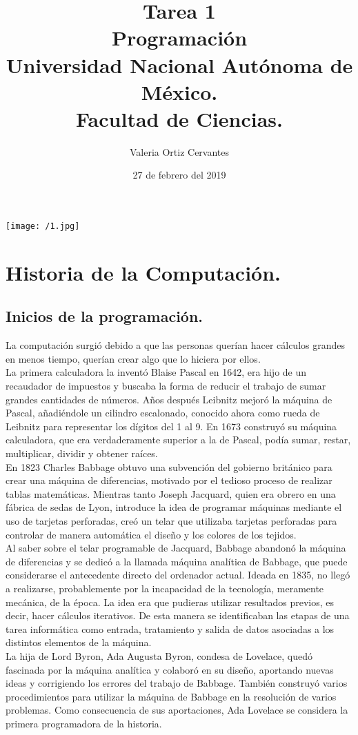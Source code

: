 \documentclass{book} %
\title{\Huge Tarea 1\\Programación\\Universidad Nacional Autónoma de México.\\Facultad de Ciencias.\\}
\author{\huge Valeria Ortiz Cervantes}
\date{\LARGE 27 de febrero del 2019}
\begin{document}
	
\maketitle
\texttt{[image: /1.jpg]}
\newpage

\tableofcontents

\chapter{\large Historia de la Computación.}
\section{Inicios de la programación.}
La computación surgió debido a que las personas querían hacer cálculos grandes en menos tiempo, querían crear algo que lo hiciera por ellos.\\La primera calculadora la inventó Blaise Pascal en 1642, era hijo de un recaudador de impuestos y buscaba la forma de reducir el trabajo de sumar grandes cantidades de números. Años después Leibnitz mejoró la máquina de Pascal, añadiéndole un cilindro escalonado, conocido ahora como rueda de Leibnitz para representar los dígitos del 1 al 9. En 1673 construyó su máquina calculadora, que era verdaderamente superior a la de Pascal, podía sumar, restar, multiplicar, dividir y obtener raíces.\\En 1823 Charles Babbage obtuvo una subvención del gobierno británico para crear una máquina de diferencias, motivado por el tedioso proceso de realizar tablas matemáticas. Mientras tanto Joseph Jacquard, quien era obrero en una fábrica de sedas de Lyon, introduce la idea de programar máquinas mediante el uso de tarjetas perforadas, creó un telar que utilizaba tarjetas perforadas para controlar de manera automática el diseño y los colores de los tejidos. \\Al saber sobre el telar programable de Jacquard, Babbage abandonó la máquina de diferencias y se dedicó a la llamada máquina analítica de Babbage, que puede considerarse el antecedente directo del ordenador actual. Ideada en 1835, no llegó a realizarse, probablemente por la incapacidad de la tecnología, meramente mecánica, de la época. La idea era que pudieras utilizar resultados previos, es decir, hacer cálculos iterativos. De esta manera se identificaban las etapas de una tarea informática como entrada, tratamiento y salida de datos asociadas a los distintos elementos de la máquina. \\La hija de Lord Byron, Ada Augusta Byron, condesa de Lovelace, quedó fascinada por la máquina analítica y colaboró en su diseño, aportando nuevas ideas y corrigiendo los errores del trabajo de Babbage. También construyó varios procedimientos para utilizar la máquina de Babbage en la resolución de varios problemas. Como consecuencia de sus aportaciones, Ada Lovelace se considera la primera programadora de la historia.
\end{document}
